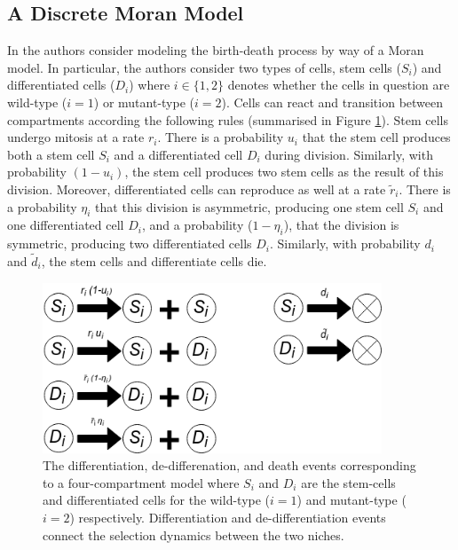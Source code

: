 \documentclass[12pt]{article}
\begin{document}
\subsection{A Discrete Moran Model}

In \cite{mohammad} the authors consider modeling the birth-death process by way of a Moran model. In particular, the authors consider two types of cells, stem cells ($S_i$) and differentiated cells ($D_i$) where $i\in\{1,2\}$ denotes whether the cells in question are wild-type ($i=1$) or mutant-type ($i=2$). Cells can react and transition between compartments according the following rules (summarised in Figure \ref{MohFig1}). Stem cells undergo mitosis at a rate $r_i$. There is a probability $u_i$ that the stem cell produces both a stem cell $S_i$ and a differentiated cell $D_i$ during division. Similarly, with probability $(1-u_i)$, the stem cell produces two stem cells as the result of this division. Moreover, differentiated cells can reproduce as well at a rate $\tilde{r}_i$. There is a probability $\eta_i$ that this division is asymmetric, producing one stem cell $S_i$ and one differentiated cell $D_i$, and a probability ($1-\eta_i$), that the division is symmetric, producing two differentiated cells $D_i$. Similarly, with probability $d_i$ and $\tilde{d}_i$, the stem cells and differentiate cells die.

\begin{figure}[!ht]
\begin{center}
\includegraphics[width=0.9\textwidth]{moh_rxn.png}
\end{center}
\caption{The differentiation, de-differenation, and death events corresponding to a four-compartment model where $S_i$ and $D_i$ are the stem-cells and differentiated cells for the wild-type ($i=1$) and mutant-type ($i=2$) respectively. Differentiation and de-differentiation events connect the selection dynamics between the two niches.}\label{MohFig1}
\end{figure}
\end{document}
